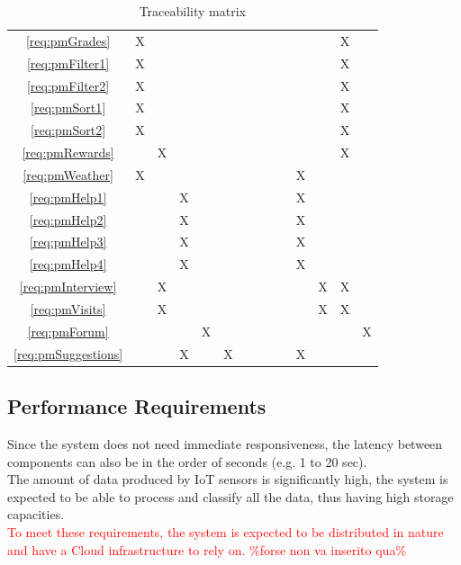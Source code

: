 \documentclass[10pt]{article}
\begin{document}
\begin{table}[]
\begin{center}
\begin{tabular}{|c|ccccc|cccccccc|}
    \ref{req:pmGrades}  & X &  &  &  &  &  &  &  &  &  &  & X &  \\
    \ref{req:pmFilter1}  & X &  &  &  &  &  &  &  &  &  &  & X &  \\
    \ref{req:pmFilter2}  & X &  &  &  &  &  &  &  &  &  &  & X &  \\
    \ref{req:pmSort1}  & X &  &  &  &  &  &  &  &  &  &  & X &  \\
    \ref{req:pmSort2}  & X &  &  &  &  &  &  &  &  &  &  & X &  \\
    \ref{req:pmRewards}  &  & X &  &  &  &  &  &  &  &  &  & X &  \\
    \ref{req:pmWeather}  & X &  &  &  &  &  &  &  &  & X &  &  &  \\
    \ref{req:pmHelp1}  &  &  & X &  &  &  &  &  &  & X &  &  &  \\
    \ref{req:pmHelp2}  &  &  & X &  &  &  &  &  &  & X &  &  &  \\
    \ref{req:pmHelp3}  &  &  & X &  &  &  &  &  &  & X &  &  &  \\
    \ref{req:pmHelp4}  &  &  & X &  &  &  &  &  &  & X &  &  &  \\
    \ref{req:pmInterview}  &  & X &  &  &  &  &  &  &  &  & X & X &  \\
    \ref{req:pmVisits}  &  & X &  &  &  &  &  &  &  &  & X & X &  \\
    \ref{req:pmForum}  &  &  &  & X &  &  &  &  &  &  &  &  & X \\
    \ref{req:pmSuggestions}  &  &  & X &  & X &  &  &  &  & X &  &  &  \\
    \hline
    \end{tabular}
    \end{center}
    \caption{Traceability matrix}
\end{table}
\newpage
\subsection{Performance Requirements}
Since the system does not need immediate responsiveness, the latency between components can also be in the order of seconds (e.g. 1 to 20 sec).\\
The amount of data produced by IoT sensors is significantly high, the system is expected to be able to process and classify all the data, thus having high storage capacities.\\
\textcolor{red}{To meet these requirements, the system is expected to be distributed in nature and have a Cloud infrastructure to rely on. \%forse non va inserito qua\%}
\end{document}
